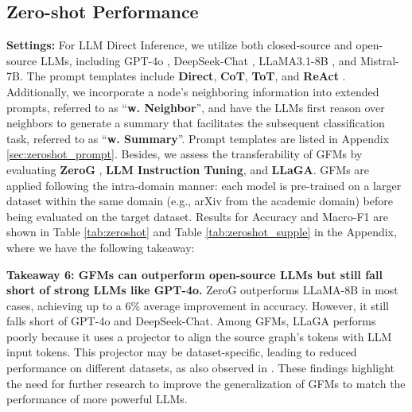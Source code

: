 \subsection{Zero-shot Performance}
\textbf{Settings:} For LLM Direct Inference, we utilize both closed-source and open-source LLMs, including GPT-4o \cite{Achiam2023GPT4TR}, DeepSeek-Chat \cite{Shao2024DeepSeekV2AS}, LLaMA3.1-8B \cite{llama3modelcard}, and Mistral-7B. The prompt templates include \textbf{Direct}, \textbf{CoT}, \textbf{ToT}, and \textbf{ReAct} \cite{Yao2022ReActSR}. Additionally, we incorporate a node's neighboring information into extended prompts, referred to as ``\textbf{w. Neighbor}'', and have the LLMs first reason over neighbors to generate a summary that facilitates the subsequent classification task, referred to as ``\textbf{w. Summary}''. Prompt templates are listed in Appendix \ref{sec:zeroshot_prompt}. Besides, we assess the transferability of GFMs by evaluating \textbf{ZeroG} \cite{li2024zerog}, \textbf{LLM Instruction Tuning}, and \textbf{LLaGA}. GFMs are applied following the intra-domain manner: each model is pre-trained on a larger dataset within the same domain (e.g., arXiv from the academic domain) before being evaluated on the target dataset. Results for Accuracy and Macro-F1 are shown in Table \ref{tab:zeroshot} and Table \ref{tab:zeroshot_supple} in the Appendix, where we have the following takeaway: 





\textbf{Takeaway 6: GFMs can outperform open-source LLMs but still fall short of strong LLMs like GPT-4o.} ZeroG outperforms LLaMA-8B in most cases, achieving up to a 6\% average improvement in accuracy. However, it still falls short of GPT-4o and DeepSeek-Chat. Among GFMs, LLaGA performs poorly because it uses a projector to align the source graph's tokens with LLM input tokens. This projector may be dataset-specific, leading to reduced performance on different datasets, as also observed in \citet{Zhu2024GraphCLIPET}. These findings highlight the need for further research to improve the generalization of GFMs to match the performance of more powerful LLMs.


